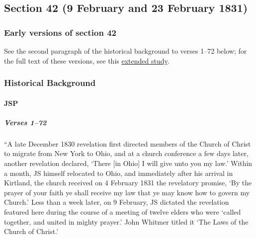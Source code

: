 \subsection{Section 42 (9 February and 23 February 1831)}
	\label{DC42}
	
	\subsubsection{Early versions of section 42}
	
		See the second paragraph of the historical background to verses 1--72 below; for the full text of these versions, see this \hyperref[EXSS-DC42-EARLY]{extended study}.
	
	\subsubsection{Historical Background}
		\label{DC42-HB}
		
		\paragraph{JSP}
		
			\subparagraph{Verses 1--72}
			
				``A late December 1830 revelation first directed members of the Church of Christ to migrate from New York to Ohio, and at a church conference a few days later, another revelation declared, `There [in Ohio] I will give unto you my law.' Within a month, JS himself relocated to Ohio, and immediately after his arrival in Kirtland, the church received on 4 February 1831 the revelatory promise, `By the prayer of your faith ye shall receive my law that ye may know how to govern my Church.' Less than a week later, on 9 February, JS dictated the revelation featured here during the course of a meeting of twelve elders who were `called together, and united in mighty prayer.' John Whitmer titled it `The Laws of the Church of Christ.'

